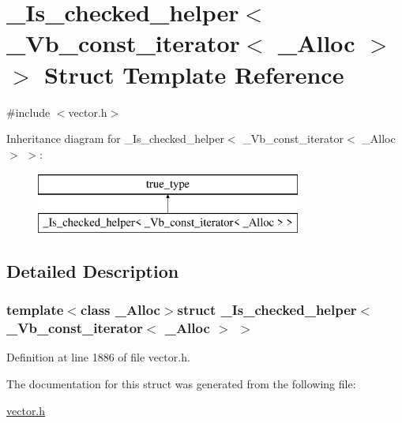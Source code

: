\hypertarget{struct___is__checked__helper_3_01___vb__const__iterator_3_01___alloc_01_4_01_4}{\section{\+\_\+\+Is\+\_\+checked\+\_\+helper$<$ \+\_\+\+Vb\+\_\+const\+\_\+iterator$<$ \+\_\+\+Alloc $>$ $>$ Struct Template Reference}
\label{struct___is__checked__helper_3_01___vb__const__iterator_3_01___alloc_01_4_01_4}
}


{\ttfamily \#include $<$vector.\+h$>$}

Inheritance diagram for \+\_\+\+Is\+\_\+checked\+\_\+helper$<$ \+\_\+\+Vb\+\_\+const\+\_\+iterator$<$ \+\_\+\+Alloc $>$ $>$\+:\begin{figure}[H]
\begin{center}
\leavevmode
\includegraphics[height=2.000000cm]{struct___is__checked__helper_3_01___vb__const__iterator_3_01___alloc_01_4_01_4}
\end{center}
\end{figure}


\subsection{Detailed Description}
\subsubsection*{template$<$class \+\_\+\+Alloc$>$struct \+\_\+\+Is\+\_\+checked\+\_\+helper$<$ \+\_\+\+Vb\+\_\+const\+\_\+iterator$<$ \+\_\+\+Alloc $>$ $>$}



Definition at line 1886 of file vector.\+h.



The documentation for this struct was generated from the following file\+:\begin{DoxyCompactItemize}
\item 
\hyperlink{vector_8h}{vector.\+h}\end{DoxyCompactItemize}
